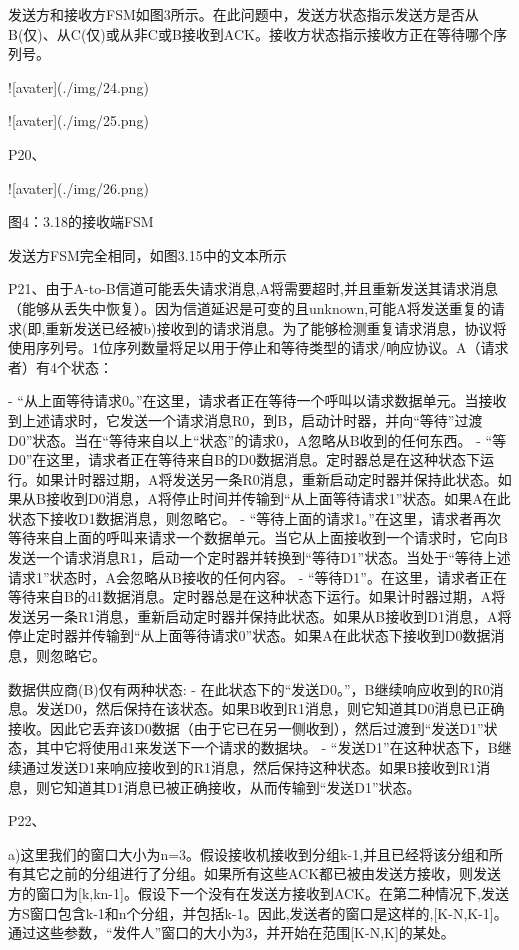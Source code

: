 \documentclass[11pt,UTF8,twoside]{article}
\begin{document}
	发送方和接收方FSM如图3所示。在此问题中，发送方状态指示发送方是否从B(仅)、从C(仅)或从非C或B接收到ACK。接收方状态指示接收方正在等待哪个序列号。
	
	![avater](./img/24.png)
	
	![avater](./img/25.png)
	
	P20、
	
	![avater](./img/26.png)
	
	图4：3.18的接收端FSM
	
	发送方FSM完全相同，如图3.15中的文本所示
	
	P21、由于A-to-B信道可能丢失请求消息,A将需要超时,并且重新发送其请求消息（能够从丢失中恢复）。因为信道延迟是可变的且unknown,可能A将发送重复的请求(即,重新发送已经被b)接收到的请求消息。为了能够检测重复请求消息，协议将使用序列号。1位序列数量将足以用于停止和等待类型的请求/响应协议。A（请求者）有4个状态：
	
	- “从上面等待请求0。”在这里，请求者正在等待一个呼叫以请求数据单元。当接收到上述请求时，它发送一个请求消息R0，到B，启动计时器，并向“等待”过渡D0”状态。当在“等待来自以上“状态”的请求0，A忽略从B收到的任何东西。
	- “等D0”在这里，请求者正在等待来自B的D0数据消息。定时器总是在这种状态下运行。如果计时器过期，A将发送另一条R0消息，重新启动定时器并保持此状态。如果从B接收到D0消息，A将停止时间并传输到“从上面等待请求1”状态。如果A在此状态下接收D1数据消息，则忽略它。
	- “等待上面的请求1。”在这里，请求者再次等待来自上面的呼叫来请求一个数据单元。当它从上面接收到一个请求时，它向B发送一个请求消息R1，启动一个定时器并转换到“等待D1”状态。当处于“等待上述请求1”状态时，A会忽略从B接收的任何内容。
	- “等待D1”。在这里，请求者正在等待来自B的d1数据消息。定时器总是在这种状态下运行。如果计时器过期，A将发送另一条R1消息，重新启动定时器并保持此状态。如果从B接收到D1消息，A将停止定时器并传输到“从上面等待请求0”状态。如果A在此状态下接收到D0数据消息，则忽略它。
	
	数据供应商(B)仅有两种状态:
	- 在此状态下的“发送D0。”，B继续响应收到的R0消息。发送D0，然后保持在该状态。如果B收到R1消息，则它知道其D0消息已正确接收。因此它丢弃该D0数据（由于它已在另一侧收到），然后过渡到“发送D1”状态，其中它将使用d1来发送下一个请求的数据块。
	- “发送D1”在这种状态下，B继续通过发送D1来响应接收到的R1消息，然后保持这种状态。如果B接收到R1消息，则它知道其D1消息已被正确接收，从而传输到“发送D1”状态。
	
	P22、
	
	a)这里我们的窗口大小为n=3。假设接收机接收到分组k-1,并且已经将该分组和所有其它之前的分组进行了分组。如果所有这些ACK都已被由发送方接收，则发送方的窗口为[k,kn-1]。假设下一个没有在发送方接收到ACK。在第二种情况下,发送方S窗口包含k-1和n个分组，并包括k-1。因此,发送者的窗口是这样的,[K-N,K-1]。通过这些参数，“发件人”窗口的大小为3，并开始在范围[K-N,K]的某处。
	
\end{document}
